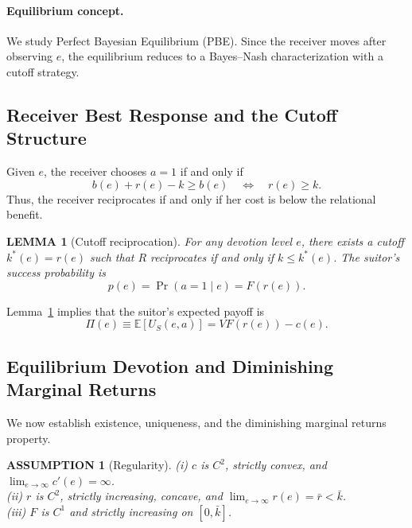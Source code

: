 \documentclass[AER]{AEA}
\newtheorem{lemma}{LEMMA}
\newtheorem{assumption}{ASSUMPTION}
\begin{document}
\paragraph{Equilibrium concept.} We study Perfect Bayesian Equilibrium (PBE). Since the
receiver moves after observing $e$, the equilibrium reduces to a Bayes--Nash
characterization with a cutoff strategy.

\subsection{Receiver Best Response and the Cutoff Structure}

Given $e$, the receiver chooses $a = 1$ if and only if
\begin{equation}
  b(e) + r(e) - k \geq b(e) \quad \iff \quad r(e) \geq k.
\end{equation}
Thus, the receiver reciprocates if and only if her cost is below the relational benefit.

\begin{lemma}[Cutoff reciprocation]\label{lem:cutoff}
  For any devotion level $e$, there exists a cutoff $k^*(e) = r(e)$ such that $R$
  reciprocates if and only if $k \leq k^*(e)$. The suitor's success probability is
  \begin{equation}
    p(e) = \Pr(a = 1 \mid e) = F(r(e)).
  \end{equation}
\end{lemma}

Lemma~\ref{lem:cutoff} implies that the suitor's expected payoff is
\begin{equation}
  \Pi(e) \equiv \mathbb{E}[U_S(e, a)] = VF(r(e)) - c(e).
\end{equation}

\subsection{Equilibrium Devotion and Diminishing Marginal Returns}

We now establish existence, uniqueness, and the diminishing marginal returns property.

\begin{assumption}[Regularity]\label{ass:regularity}
  (i) $c$ is $C^2$, strictly convex, and $\lim_{e \to \infty} c'(e) = \infty$.\\
  (ii) $r$ is $C^2$, strictly increasing, concave, and $\lim_{e \to \infty} r(e) = \bar{r} < \bar{k}$.\\
  (iii) $F$ is $C^1$ and strictly increasing on $[0, \bar{k}]$.
\end{assumption}
\end{document}

